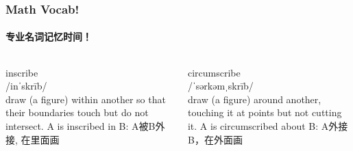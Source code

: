 \documentclass[
	11pt, %
]{beamer}
\begin{document}

\begin{frame}
	\frametitle{Math Vocab!} %
	\framesubtitle{专业名词记忆时间！}
	\begin{columns}[t] 
	\begin{column}{0.45\textwidth} %
		{\Huge inscribe}\\
		{\LARGE /inˈskrīb/\\
			\bigskip\bigskip
			draw (a figure) \alert{within} another so that their boundaries touch but do not intersect.
		A is inscribed in B: A被B外接, 在里面画}
	\end{column}
	\begin{column}{0.45\textwidth} %
		{\Huge circumscribe}\\
		{\LARGE /ˈsərkəmˌskrīb/\\
			\bigskip\bigskip
			draw (a figure) around another, touching it at points but not cutting it.
		A is circumscribed about B: A外接B，在外面画}	
	\end{column}
\end{columns}
\end{frame}

\end{document}
